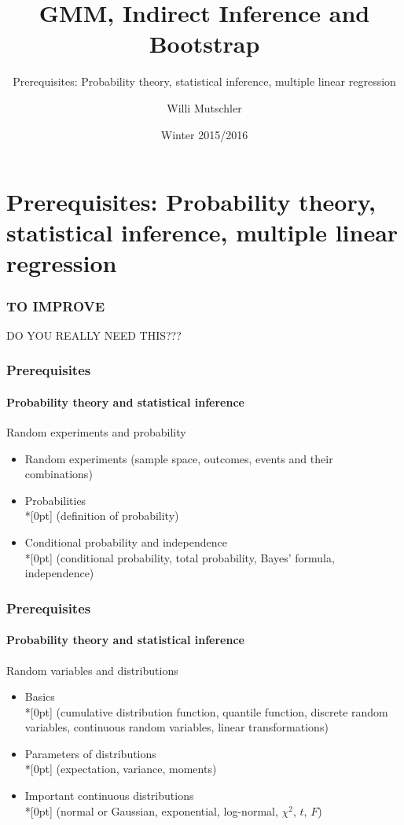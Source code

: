 \documentclass[notes=show]{beamer}
\begin{document}
\title{GMM, Indirect Inference and Bootstrap}
\subtitle{Prerequisites: Probability theory, statistical inference, multiple linear regression}
\author[Willi Mutschler]{Willi Mutschler}
\date{Winter 2015/2016}
\maketitle

\section{Prerequisites: Probability theory, statistical inference, multiple linear regression}
\begin{frame}\frametitle{TO IMPROVE}
  DO YOU REALLY NEED THIS??? 
\end{frame}

\begin{frame}\frametitle{Prerequisites}\framesubtitle{Probability theory and statistical inference}
Random experiments and probability
\begin{itemize}
    \item Random experiments\newline
        (sample space, outcomes, events and their combinations)
    \item Probabilities\\*[0pt]
        (definition of probability)
    \item Conditional probability and independence\\*[0pt]
        (conditional probability, total probability, Bayes' formula, independence)
\end{itemize}
\end{frame}


\begin{frame}\frametitle{Prerequisites}\framesubtitle{Probability theory and statistical inference}
Random variables and distributions
\begin{itemize}
    \item Basics\\*[0pt]
        (cumulative distribution function, quantile function, discrete random variables, continuous random variables, linear transformations)
    \item Parameters of distributions\\*[0pt]
        (expectation, variance, moments)
    \item Important continuous distributions\\*[0pt]
        (normal or Gaussian, exponential, log-normal, $\chi ^{2}$, $t$, $F$)
\end{itemize}
\end{frame}
\end{document}

